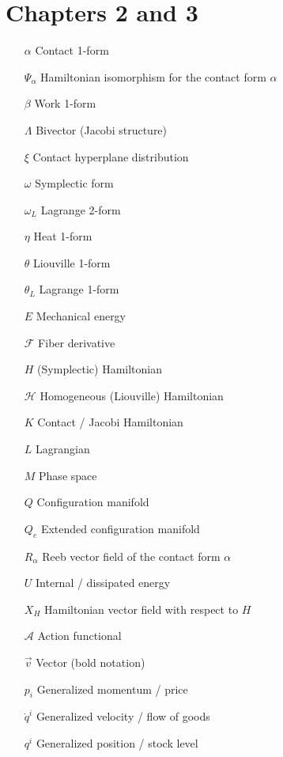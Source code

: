 \section*{Chapters 2 and 3}
\begin{itemize}[itemsep=0pt, leftmargin=3.4cm, labelsep=0cm, labelwidth=3.3cm, align=left]
    \item[$\alpha$] Contact 1-form
    \item[$\Psi_{\alpha}$] Hamiltonian isomorphism for the contact form $\alpha$
    \item[$\beta$] Work 1-form
    \item[$\Lambda$] Bivector (Jacobi structure)
    \item[$\xi$] Contact hyperplane distribution
    \item[$\omega$] Symplectic form
    \item[$\omega_L$] Lagrange 2-form
    \item[$\eta$] Heat 1-form
    \item[$\theta$] Liouville 1-form
    \item[$\theta_L$] Lagrange 1-form
%
    \item[$E$] Mechanical energy
    \item[$\mathscr{F}$] Fiber derivative
    \item[$H$] (Symplectic) Hamiltonian
    \item[$\mathscr{H}$] Homogeneous (Liouville) Hamiltonian
    \item[$K$] Contact / Jacobi Hamiltonian 
    \item[$L$] Lagrangian
    \item[$M$] Phase space
    \item[$Q$] Configuration manifold
    \item[$Q_e$] Extended configuration manifold
    \item[$R_\alpha$] Reeb vector field of the contact form $\alpha$ 
    \item[$U$] Internal / dissipated energy
    \item[$X_H$] Hamiltonian vector field with respect to $H$
    \item[$\mathscr{A}$] Action functional
    \item[$\vec{v}$] Vector (bold notation)
    \item[$p_i$] Generalized momentum / price
    \item[$\dot{q}^i$] Generalized velocity / flow of goods
    \item[$q^i$] Generalized position / stock level

\end{itemize}
